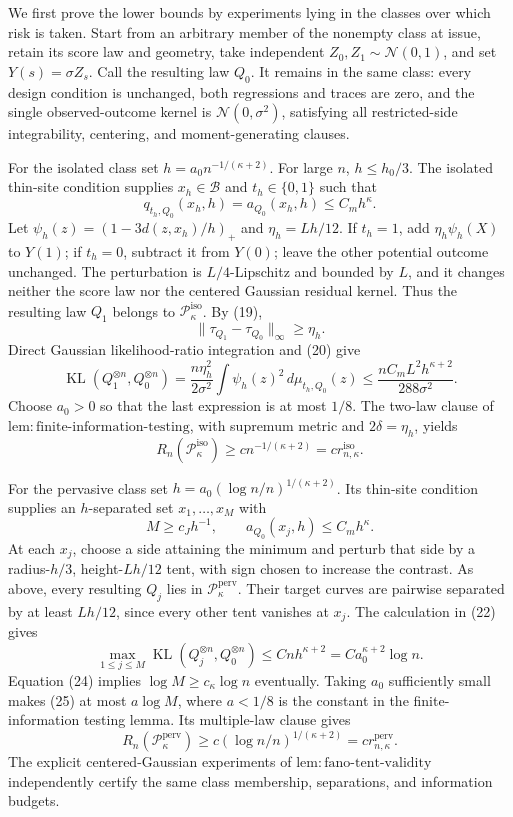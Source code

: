 We first prove the lower bounds by experiments lying in the classes over
which risk is taken.  Start from an arbitrary member of the nonempty class
at issue, retain its score law and geometry, take independent
\(Z_0,Z_1\sim\mathcal N(0,1)\), and set \(Y(s)=\sigma Z_s\).  Call the
resulting law \(Q_0\).  It remains in the same class: every design
condition is unchanged, both regressions and traces are zero, and the
single observed-outcome kernel is \(\mathcal N(0,\sigma^2)\), satisfying
all restricted-side integrability, centering, and moment-generating
clauses.

For the isolated class set \(h=a_0n^{-1/(\kappa+2)}\).  For large \(n\),
\(h\le h_0/3\).  The isolated thin-site condition supplies
\(x_h\in\mathcal B\) and \(t_h\in\{0,1\}\) such that
\[
 q_{t_h,Q_0}(x_h,h)=a_{Q_0}(x_h,h)\le C_mh^{\kappa}.
 \tag{20}
\]
Let \(\psi_h(z)=(1-3d(z,x_h)/h)_+\) and \(\eta_h=Lh/12\).  If
\(t_h=1\), add \(\eta_h\psi_h(X)\) to \(Y(1)\); if \(t_h=0\), subtract
it from \(Y(0)\); leave the other potential outcome unchanged.  The
perturbation is \(L/4\)-Lipschitz and bounded by \(L\), and it changes
neither the score law nor the centered Gaussian residual kernel.  Thus
the resulting law \(Q_1\) belongs to
\(\mathcal P_{\kappa}^{\mathrm{iso}}\).  By (19),
\[
 \|\tau_{Q_1}-\tau_{Q_0}\|_\infty\ge\eta_h.
 \tag{21}
\]
Direct Gaussian likelihood-ratio integration and (20) give
\[
 \operatorname{KL}(Q_1^{\otimes n},Q_0^{\otimes n})
 =\frac{n\eta_h^2}{2\sigma^2}
   \int\psi_h(z)^2\,d\mu_{t_h,Q_0}(z)
 \le\frac{nC_mL^2h^{\kappa+2}}{288\sigma^2}.
 \tag{22}
\]
Choose \(a_0>0\) so that the last expression is at most \(1/8\).  The
two-law clause of \(\mathrm{lem:finite\text{-}information\text{-}testing}\),
with supremum metric and \(2\delta=\eta_h\), yields
\[
 R_n(\mathcal P_{\kappa}^{\mathrm{iso}})
 \ge c n^{-1/(\kappa+2)}=c r_{n,\kappa}^{\mathrm{iso}}.
 \tag{23}
\]

For the pervasive class set
\(h=a_0(\log n/n)^{1/(\kappa+2)}\).  Its thin-site condition supplies an
\(h\)-separated set \(x_1,\ldots,x_M\) with
\[
 M\ge c_Jh^{-1},
 \qquad a_{Q_0}(x_j,h)\le C_mh^{\kappa}.
 \tag{24}
\]
At each \(x_j\), choose a side attaining the minimum and perturb that side
by a radius-\(h/3\), height-\(Lh/12\) tent, with sign chosen to increase
the contrast.  As above, every resulting \(Q_j\) lies in
\(\mathcal P_{\kappa}^{\mathrm{perv}}\).  Their target curves are pairwise
separated by at least \(Lh/12\), since every other tent vanishes at
\(x_j\).  The calculation in (22) gives
\[
 \max_{1\le j\le M}\operatorname{KL}(Q_j^{\otimes n},Q_0^{\otimes n})
 \le Cnh^{\kappa+2}=Ca_0^{\kappa+2}\log n.
 \tag{25}
\]
Equation (24) implies \(\log M\ge c_{\kappa}\log n\) eventually.  Taking
\(a_0\) sufficiently small makes (25) at most \(a\log M\), where
\(a<1/8\) is the constant in the finite-information testing lemma.  Its
multiple-law clause gives
\[
 R_n(\mathcal P_{\kappa}^{\mathrm{perv}})
 \ge c(\log n/n)^{1/(\kappa+2)}
 =c r_{n,\kappa}^{\mathrm{perv}}.
 \tag{26}
\]
The explicit centered-Gaussian experiments of
\(\mathrm{lem:fano\text{-}tent\text{-}validity}\) independently certify
the same class membership, separations, and information budgets.

